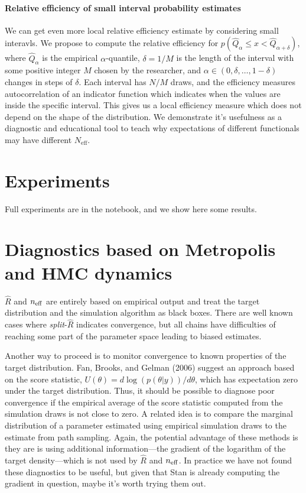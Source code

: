 \documentclass[11pt]{article}
\begin{document}
\paragraph{Relative efficiency of small interval probability estimates}

We can get even more local relative efficiency estimate by considering small interavls. We propose to compute the relative efficiency for $p(\hat{Q}_\alpha
\le x < \hat{Q}_{\alpha+\delta})$, where $\hat{Q}_\alpha$ is the empirical
$\alpha$-quantile, $\delta=1/M$ is the length of the interval with some
positive integer $M$ chosen by the researcher, and $\alpha \in (0,\delta,\ldots,1-\delta)$ changes in steps of $\delta$. 
Each interval has $N/M$ draws, and the efficiency measures 
autocorrelation of an indicator function which
indicates when the values are inside the specific interval. This gives
us a local efficiency measure which does not depend on the shape of the
distribution. We demonstrate it's usefulness as a diagnostic and
educational tool to teach why expectations of different
functionals may have different $N_{\mbox{eff}}$.

\section{Experiments}

Full experiments are in the notebook, and we show here some results.

\section{Diagnostics based on Metropolis and HMC dynamics}

$\widehat{R}$ and $n_{\rm eff}$ are entirely based on empirical output and treat the target distribution and the simulation algorithm as black boxes. There are well known cases where {\em split}-$\widehat{R}$ indicates convergence, but all chains have difficulties of reaching some part of the parameter space leading to biased estimates.

Another way to proceed is to monitor convergence to known properties of the target distribution.  Fan, Brooks, and Gelman (2006) suggest an approach based on the score statistic, $U(\theta) = d\log(p(\theta|y))/d\theta$, which has expectation zero under the target distribution.  Thus, it should be possible to diagnose poor convergence if the empirical average of the score statistic computed from the simulation draws is not close to zero.  A related idea is to compare the marginal distribution of a parameter estimated using empirical simulation draws to the estimate from path sampling.  Again, the potential advantage of these methods is they are is using additional information---the gradient of the logarithm of the target density---which is not used by $\widehat{R}$ and $n_{\rm eff}$.  In practice we have not found these diagnostics to be useful, but given that Stan is already computing the gradient in question, maybe it's worth trying them out.
\end{document}
